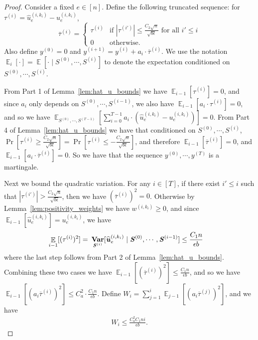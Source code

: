 \documentclass[11pt]{article}
\newcommand\uu{\boldsymbol{\mathit{u}}}
\newcommand\ww{\boldsymbol{\mathit{w}}}
\renewcommand\SS{\boldsymbol{\mathit{S}}}
\newcommand{\wh}{\widehat}
\newcommand{\ov}{\overline}
\DeclareMathOperator*{\E}{{\mathbb{E}}}
\DeclareMathOperator*{\Var}{{\bf {Var}}}
\begin{document}
\begin{proof}
Consider a fixed $e \in [n]$. Define the following truncated sequence: for $\tau^{(i)} = \wh{\uu}_e^{(i,k_i)} - \uu_e^{(i,k_i)}$,  
\[
\ov{\tau}^{(i)} = 
\begin{cases}
\tau^{(i)} & \text{if } |\tau^{(i')}| \leq \frac{C_2 \sqrt{n}}{\sqrt{b \epsilon}} \text{ for all } i' \leq i\\
0 & \text{otherwise.}
\end{cases}
\]
Also define $y^{(0)} = 0$ and $y^{(i+1)} = y^{(i)} + a_i \cdot \ov{\tau}^{(i)}$. We use the notation $\E_{i}[\cdot] = \E[\cdot \mid \SS^{(0)}, \cdots, \SS^{(i)}]$ to denote the expectation conditioned on $\SS^{(0)}, \cdots, \SS^{(i)}$.

From Part 1 of Lemma~\ref{lem:hat_u_bounds} we have $\E_{i-1}[\tau^{(i)}] = 0$, and since $a_i$ only depends on $\SS^{(0)}, \cdots, \SS^{(i-1)}$, we also have $\E_{i-1}[a_i \cdot \tau^{(i)}] = 0$, and so we have $\E_{\SS^{(0)},\cdots,\SS^{(T-1)}}[\sum_{i=0}^{T-1} a_i \cdot (\wh{\uu}^{(i,k_i)}_e - \uu^{(i,k_i)}_e)] = 0$. From Part 4 of Lemma~\ref{lem:hat_u_bounds} we have that conditioned on $\SS^{(0)}, \cdots, \SS^{(i)}$, $\Pr[\tau^{(i)} \geq \frac{C_2 \sqrt{n}}{\sqrt{b \epsilon}}] = \Pr[\tau^{(i)} \leq -\frac{C_2 \sqrt{n}}{\sqrt{b \epsilon}}]$, and therefore $\E_{i-1}[\ov{\tau}^{(i)}] = 0$, and $\E_{i-1}[a_i \cdot \ov{\tau}^{(i)}] = 0$. So we have that the sequence $y^{(0)}, \cdots, y^{(T)}$ is a martingale.


Next we bound the quadratic variation. For any $i \in [T]$, if there exist $i' \leq i$ such that $|\tau^{(i')}| > \frac{C_2 \sqrt{n}}{\sqrt{b \epsilon}}$, then we have $(\ov{\tau}^{(i)})^2 = 0$. Otherwise by Lemma~\ref{lem:positivity_weights} we have $\ww^{(i,k_i)} \geq 0$, and since $\E_{i-1}[\wh{\uu}_e^{(i,k_i)}] = \uu_e^{(i,k_i)}$, we have
\begin{align*}
\E_{i-1}[(\tau^{(i)})^2] = &~ \Var_{\SS^{(i)}}[\wh{\uu}_e^{(i,k_i)} \mid \SS^{(0)}, \cdots, \SS^{(i-1)}] 
\leq \frac{C_1 n}{\epsilon b}
\end{align*}
where the last step follows from Part 2 of Lemma~\ref{lem:hat_u_bounds}. Combining these two cases we have $\E_{i-1}[(\ov{\tau}^{(i)})^2] \leq \frac{C_1 n}{\epsilon b}$, and so we have $\E_{i-1}[(a_i \ov{\tau}^{(i)})^2] \leq C_a^2 \cdot \frac{C_1 n}{\epsilon b}$. 
Define $W_i = \sum_{j=1}^i \E_{j-1}[(a_i \ov{\tau}^{(j)})^2]$, and we have
\begin{align*}
W_i \leq \frac{C_a^2 C_1 n i}{\epsilon b}.
\end{align*}


\end{proof}
\end{document}
